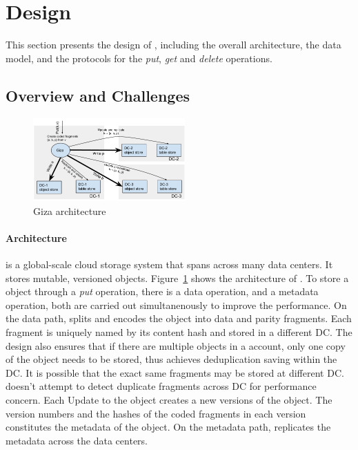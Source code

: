 \section{Design}
\label{sec:design}

This section presents the design of {\name}, including the overall architecture,
the data model, and the protocols for the {\em put}, {\em get} and {\em delete} operations.

\subsection{Overview and Challenges}

\begin{figure}[tp]
\centering
\includegraphics[width=0.52\textwidth]{fig/Giza}
\caption{Giza architecture\label{fig:arch}}
\end{figure}

\paragraph{Architecture}
{\name} is a global-scale cloud storage system that spans across many data
centers. It stores mutable, versioned objects. Figure~\ref{fig:arch} shows the
architecture of \name. To store a \name object through a {\em put} operation,
there is a data operation, and a metadata operation, both are carried out
simultanenously to improve the performance. On the data path, \name splits and
encodes the object into data and parity fragments. Each fragment is uniquely
named by its content hash and stored in a different DC. The design also ensures
that if there are multiple objects in a \name account, only one copy of the
object needs to be stored, thus achieves deduplication saving within the DC. It
is possible that the exact same fragments may be stored at different DC. \name
doesn't attempt to detect duplicate fragments across DC for performance concern.
Each Update to the object creates a new versions of the object. The version
numbers and the hashes of the coded fragments in each version constitutes the
metadata of the object. On the metadata path, \name replicates the metadata
across the data centers.

